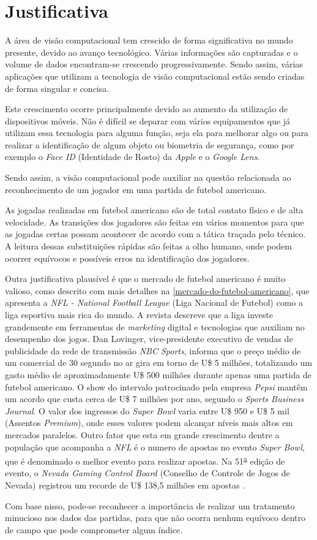 \section{\textbf{Justificativa}}

A área de visão computacional tem crescido de forma significativa no mundo presente, devido ao avanço tecnológico. Várias informações são capturadas e o volume de dados encontram-se crescendo progressivamente. Sendo assim, várias aplicações que utilizam a tecnologia de visão computacional estão sendo criadas de forma singular e concisa.

Este crescimento ocorre principalmente devido ao aumento da utilização de dispositivos móveis. Não é difícil se deparar com vários equipamentos que já utilizam essa tecnologia para alguma função, seja ela para melhorar algo ou para realizar a identificação de algum objeto ou biometria de segurança, como por exemplo o \textit{Face ID} (Identidade de Rosto) da \textit{Apple} e o \textit{Google Lens}.

Sendo assim, a visão computacional pode auxiliar na questão relacionada ao reconhecimento de um jogador em uma partida de futebol americano.

As jogadas realizadas em futebol americano são de total contato físico e de alta velocidade. As transições dos jogadores são feitas em vários momentos para que as jogadas certas possam acontecer de acordo com a tática traçada pelo técnico. A leitura dessas substituições rápidas são feitas a olho humano, onde podem ocorrer equívocos e possíveis erros na identificação dos jogadores.

Outra justificativa plausível é que o mercado de futebol americano é muito valioso, como descrito com mais detalhes na \autoref{mercado-do-futebol-americano}, que apresenta a \textit{NFL - National Football League} (Liga Nacional de Futebol) como a liga esportiva mais rica do mundo. A revista  descreve que a liga investe grandemente em ferramentas de \textit{marketing} digital e tecnologias que auxiliam no desempenho dos jogos. Dan Lovinger, vice-presidente executivo de vendas de publicidade da rede de transmissão \textit{NBC Sports}, informa que o preço médio de um comercial de 30 segundo no ar gira em torno de U\$ 5 milhões, totalizando um gasto médio de aproximadamente U\$ 500 milhões durante apenas uma partida de futebol americano. O show do intervalo patrocinado pela empresa \textit{Pepsi} mantêm um acordo que custa cerca de U\$ 7 milhões por ano, segundo o \textit{Sports Business Journal}. O valor dos ingressos do \textit{Super Bowl} varia entre U\$ 950 e U\$ 5 mil (Assentos \textit{Premium}), onde esses valores podem alcançar níveis mais altos em mercados paralelos. Outro fator que esta em grande crescimento dentre a população que acompanha a \textit{NFL} é o numero de apostas no evento \textit{Super Bowl}, que é denominado o melhor evento para realizar apostas. Na 51\textsuperscript{\underline{a}} edição de evento, o \textit{Nevada Gaming Control Board} (Conselho de Controle de Jogos de Nevada) registrou um recorde de U\$ 138,5 milhões em apostas \cite{FORBES2018}.

Com base nisso, pode-se reconhecer a importância de realizar um tratamento minucioso nos dados das partidas, para que não ocorra nenhum equívoco dentro de campo que pode comprometer algum índice.